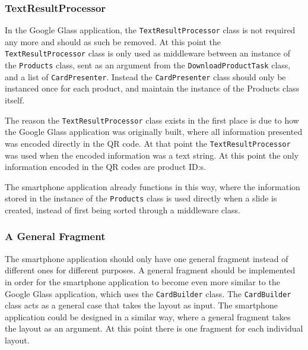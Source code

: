 

\subsubsection{TextResultProcessor}
In the Google Glass application, the \texttt{TextResultProcessor} class is not required any more and should as such be removed. At this point the \texttt{TextResultProcessor} class is only used as middleware between an instance of the \texttt{Products} class, sent as an argument from the \texttt{DownloadProductTask} class, and a list of \texttt{CardPresenter}. Instead the \texttt{CardPresenter} class should only be instanced once for each product, and maintain the instance of the Products class itself.

The reason the \texttt{TextResultProcessor} class exists in the first place is due to how the Google Glass application was originally built, where all information presented was encoded directly in the QR code. At that point the \texttt{TextResultProcessor} was used when the encoded information was a text string. At this point the only information encoded in the QR codes are product ID:s.

The smartphone application already functions in this way, where the information stored in the instance of the \texttt{Products} class is used directly when a slide is created, instead of first being sorted through a middleware class.


\subsubsection{A General Fragment}
The smartphone application should only have one general fragment instead of different ones for different purposes. A general fragment should be implemented in order for the smartphone application to become even more similar to the Google Glass application, which uses the \texttt{CardBuilder} class. The \texttt{CardBuilder} class acts as a general case that takes the layout as input. The smartphone application could be designed in a similar way, where a general fragment takes the layout as an argument. At this point there is one fragment for each individual layout.
